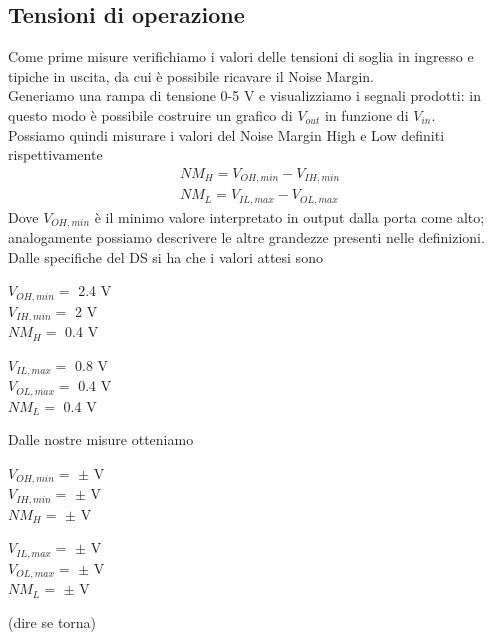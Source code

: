 \documentclass[10pt, a4paper, italian]{article}
\begin{document}
\subsection{Tensioni di operazione}
Come prime misure verifichiamo i valori delle tensioni di soglia in ingresso e tipiche in uscita, da cui è possibile ricavare il Noise Margin.\\
Generiamo una rampa di tensione 0-5 V e visualizziamo i segnali prodotti:
in questo modo è possibile costruire un grafico di $V_{out}$ in funzione di $V_{in}$.\\ %
Possiamo quindi misurare i valori del Noise Margin High e Low definiti rispettivamente
\begin{gather*}
    NM_H=V_{OH,min}-V_{IH,min}\\
    NM_L=V_{IL,max}-V_{OL,max}
\end{gather*}
Dove $V_{OH,min}$ è il minimo valore interpretato in output dalla porta come alto; analogamente possiamo descrivere le altre grandezze presenti nelle definizioni.\\
Dalle specifiche del DS si ha che i valori attesi sono %
\begin{multicols}{2}
    \centering
    $V_{OH,min}=$ 2.4 V\\ %
    $V_{IH,min}=$ 2 V\\
    $NM_H=$ 0.4 V
    
    $V_{IL,max}=$ 0.8 V\\
    $V_{OL,max}=$ 0.4 V\\ %
    $NM_L=$ 0.4 V
\end{multicols}
Dalle nostre misure otteniamo %
\begin{multicols}{2}
    \centering
    $V_{OH,min}=$ $\pm$ V\\
    $V_{IH,min}=$ $\pm$ V\\
    $NM_H=$ $\pm$ V
    
    $V_{IL,max}=$ $\pm$ V\\
    $V_{OL,max}=$ $\pm$ V\\
    $NM_L=$ $\pm$ V
\end{multicols}
(dire se torna)
\end{document}
